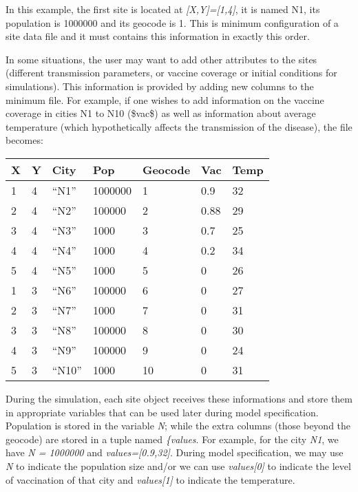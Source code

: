 \documentclass[a4paper,10pt]{manual}
\begin{document}
In this example, the first site is located at \emph{{[}X,Y{]}={[}1,4{]}}, it is named N1, its population is 1000000 and its geocode is 1. This is minimum configuration of a site data file and it must contains this information in exactly this order.

In some situations, the user may want to add other attributes to the sites (different transmission parameters, or vaccine coverage or initial conditions for simulations). This information is provided by adding new columns to the minimum file. For example, if one wishes to add information on the vaccine coverage in cities N1 to N10 (\$vac\$) as well as information about average temperature (which hypothetically affects the transmission of the disease), the file becomes:

\begin{tabulary}{\textwidth}{|L|L|L|L|L|L|L|}
\hline
\textbf{
X
} & \textbf{
Y
} & \textbf{
City
} & \textbf{
Pop
} & \textbf{
Geocode
} & \textbf{
Vac
} & \textbf{
Temp
}\\
\hline

1
 & 
4
 & 
``N1''
 & 
1000000
 & 
1
 & 
0.9
 & 
32
\\

2
 & 
4
 & 
``N2''
 & 
100000
 & 
2
 & 
0.88
 & 
29
\\

3
 & 
4
 & 
``N3''
 & 
1000
 & 
3
 & 
0.7
 & 
25
\\

4
 & 
4
 & 
``N4''
 & 
1000
 & 
4
 & 
0.2
 & 
34
\\

5
 & 
4
 & 
``N5''
 & 
1000
 & 
5
 & 
0
 & 
26
\\

1
 & 
3
 & 
``N6''
 & 
100000
 & 
6
 & 
0
 & 
27
\\

2
 & 
3
 & 
``N7''
 & 
1000
 & 
7
 & 
0
 & 
31
\\

3
 & 
3
 & 
``N8''
 & 
100000
 & 
8
 & 
0
 & 
30
\\

4
 & 
3
 & 
``N9''
 & 
100000
 & 
9
 & 
0
 & 
24
\\

5
 & 
3
 & 
``N10''
 & 
1000
 & 
10
 & 
0
 & 
31
\\
\hline
\end{tabulary}


During the simulation, each site object receives these informations and store them in appropriate variables that can be used later during model specification. Population is stored in the variable  \emph{N}; while the extra columns (those beyond the geocode) are stored in a tuple named \emph{\{values}. For example, for the city  \emph{N1}, we have  \emph{N = 1000000} and  \emph{values={[}0.9,32{]}}. During model specification, we may use  \emph{N} to indicate the population size and/or we can use \emph{values{[}0{]}} to indicate the level of vaccination of that city and \emph{values{[}1{]}} to indicate the temperature.
\end{document}
